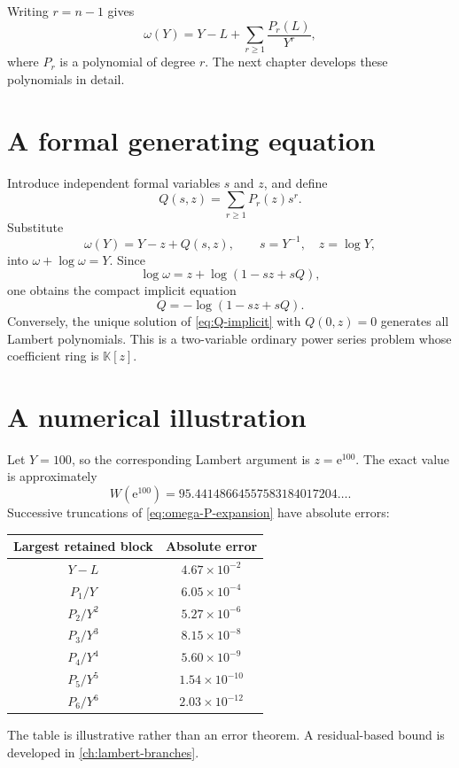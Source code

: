\documentclass[11pt,oneside]{book}
\theoremstyle{definition}
\theoremstyle{remark}
\newcommand{\K}{\mathbb K}
\newcommand{\e}{\mathrm e}
\begin{document}
Writing $r=n-1$ gives
\begin{equation}\label{eq:omega-P-expansion}
 \omega(Y)=Y-L+\sum_{r\ge1}\frac{P_r(L)}{Y^r},
\end{equation}
where $P_r$ is a polynomial of degree $r$.  The next chapter develops these
polynomials in detail.

\section{A formal generating equation}
Introduce independent formal variables $s$ and $z$, and define
\begin{equation}\label{eq:Q-generating}
 Q(s,z)=\sum_{r\ge1}P_r(z)s^r.
\end{equation}
Substitute
\[
 \omega(Y)=Y-z+Q(s,z),
 \qquad s=Y^{-1},\quad z=\log Y,
\]
into $\omega+\log\omega=Y$.  Since
\[
 \log\omega=z+\log(1-sz+sQ),
\]
one obtains the compact implicit equation
\begin{equation}\label{eq:Q-implicit}
 Q=-\log(1-sz+sQ).
\end{equation}
Conversely, the unique solution of \eqref{eq:Q-implicit} with $Q(0,z)=0$
generates all Lambert polynomials.  This is a two-variable ordinary power
series problem whose coefficient ring is $\K[z]$.

\section{A numerical illustration}
Let $Y=100$, so the corresponding Lambert argument is $z=\e^{100}$.  The exact
value is approximately
\[
 W(\e^{100})=95.44148664557583184017204\ldots.
\]
Successive truncations of \eqref{eq:omega-P-expansion} have absolute errors:
\begin{center}
\begin{tabular}{@{}c c@{}}
\toprule
Largest retained block & Absolute error \\
\midrule
$Y-L$ & $4.67\times10^{-2}$ \\
$P_1/Y$ & $6.05\times10^{-4}$ \\
$P_2/Y^2$ & $5.27\times10^{-6}$ \\
$P_3/Y^3$ & $8.15\times10^{-8}$ \\
$P_4/Y^4$ & $5.60\times10^{-9}$ \\
$P_5/Y^5$ & $1.54\times10^{-10}$ \\
$P_6/Y^6$ & $2.03\times10^{-12}$ \\
\bottomrule
\end{tabular}
\end{center}
The table is illustrative rather than an error theorem.  A residual-based
bound is developed in \cref{ch:lambert-branches}.
\end{document}
